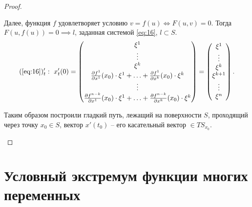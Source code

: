 \begin{proof}
\begin{enumerate}
              Далее, функция $f$ удовлетворяет условию $v = f(u) \iff F(u,v) = 0$. Тогда $F(u,f(u)) = 0\implies l$, заданная системой \ref{eq:16}, $l \subset S$.
              \[
                  (\text{\ref{eq:16}})_t': \ x_t'(0) = \left(\begin{matrix}
                          \xi^1                                                                                                  \\
                          \vdots                                                                                                 \\
                          \xi^k                                                                                                  \\
                          \frac{\partial f^1}{\partial x^1}(x_0)\cdot \xi^1 + \ldots + \frac{\partial f^1}{\partial x^k}(x_0)\cdot \xi^k \\
                          \vdots                                                                                                 \\
                          \frac{\partial f^{n-k}}{\partial x^1}(x_0)\cdot \xi^1 + \ldots + \frac{\partial f^{n-k}}{\partial x^k}(x_0)\cdot \xi^k
                      \end{matrix}\right) = \left(\begin{matrix}
                          \xi^1 \\ \vdots \\ \xi^k \\ \xi^{k+1} \\ \vdots \\ \xi^n
                      \end{matrix}\right).
              \]

              Таким образом построили гладкий путь, лежащий на поверхности $S$, проходящий через точку $x_0 \in S$, вектор $x'(t_0)$ -- его касательный вектор $\in TS_{x_0}$.
    \end{enumerate}
\end{proof}

\section{Условный экстремум функции многих переменных}

